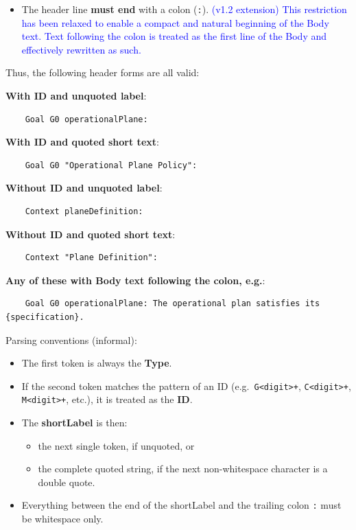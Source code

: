 \documentclass[11pt]{article}
\begin{document}
\begin{itemize}[leftmargin=2em]
  \item The header line \textbf{must end} with a colon (\texttt{:}). 
  \textcolor{blue}{(v1.2 extension) This restriction has been relaxed to enable a compact and natural beginning of the Body text. Text following the colon is treated as the first line of the Body and effectively rewritten as such.}
\end{itemize}

Thus, the following header forms are all valid:

\textbf{With ID and unquoted label}:
\begin{verbatim}
    Goal G0 operationalPlane:
\end{verbatim}

\textbf{With ID and quoted short text}:
\begin{verbatim}
    Goal G0 "Operational Plane Policy":
\end{verbatim}

\textbf{Without ID and unquoted label}:
\begin{verbatim}
    Context planeDefinition:
\end{verbatim}

\textbf{Without ID and quoted short text}:
\begin{verbatim}
    Context "Plane Definition":
\end{verbatim}

\textbf{Any of these with Body text following the colon, e.g.}:
\begin{verbatim}
    Goal G0 operationalPlane: The operational plan satisfies its {specification}.
\end{verbatim}
Parsing conventions (informal):

\begin{itemize}[leftmargin=2em]
  \item The first token is always the \textbf{Type}.
  \item If the second token matches the pattern of an ID (e.g.\ \texttt{G<digit>+}, \texttt{C<digit>+}, \texttt{M<digit>+}, etc.), it is treated as the \textbf{ID}.
  \item The \textbf{shortLabel} is then:
  \begin{itemize}[leftmargin=1.5em]
    \item the next single token, if unquoted, or
    \item the complete quoted string, if the next non-whitespace character is a double quote.
  \end{itemize}
  \item Everything between the end of the shortLabel and the trailing colon \texttt{:} must be whitespace only.
\end{itemize}
\end{document}

